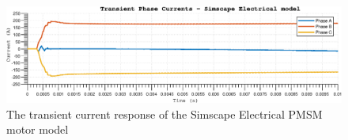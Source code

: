 \begin{figure}[htb]
\begingroup
\tikzset{}
 \centerline{\includegraphics[width=1\columnwidth]{.//Figure/EPS/PE_phase_currents.eps}}
 \endgroup
 \caption{The transient current response of the Simscape Electrical PMSM motor model}
 \label{fig:pe_current_trans}
\end{figure}
